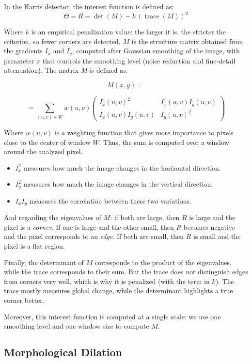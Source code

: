 In the Harris detector, the interest function is defined as:
$$
\Theta = R = \det(M) - k\,(\operatorname{trace}(M))^2
$$

Where $k$ is an empirical penalization value: the larger it is, the stricter the criterion,
so fewer corners are detected. $M$ is the structure matrix obtained from the gradients
$I_{x}$ and $I_{y}$, computed after Gaussian smoothing of the image, with parameter $\sigma$ that controls
the smoothing level (noise reduction and fine-detail attenuation). The matrix $M$ is defined as:

$$
M(x,y)=
$$

$$
=\sum_{(u,v)\in W} w(u,v)
\begin{pmatrix}
I_x(u,v)^2 & I_x(u,v)I_y(u,v)\\
I_x(u,v)I_y(u,v) & I_y(u,v)^2
\end{pmatrix}
$$

Where $w(u,v)$ is a weighting function that gives more importance to pixels close to the center
of window $W$. Thus, the sum is computed over a window around the analyzed pixel.

\begin{itemize}
  \item $I_x^2$ measures how much the image changes in the horizontal direction.
  \item $I_y^2$ measures how much the image changes in the vertical direction.
  \item $I_x I_y$ measures the correlation between these two variations.
\end{itemize}

And regarding the eigenvalues of $M$: if both are large, then $R$ is large and the pixel is a
\emph{corner}. If one is large and the other small, then $R$ becomes negative and the pixel corresponds to an
\emph{edge}. If both are small, then $R$ is small and the pixel is a flat region.

Finally, the determinant of $M$ corresponds to the product of the eigenvalues, while the trace corresponds to their
sum. But the trace does not distinguish edges from corners very well, which is why it is penalized (with the
term in $k$). The trace mostly measures global change, while the determinant highlights
a true corner better.

Moreover, this interest function is computed at a single scale: we use one smoothing level
and one window size to compute $M$.

\subsection{Morphological Dilation}

